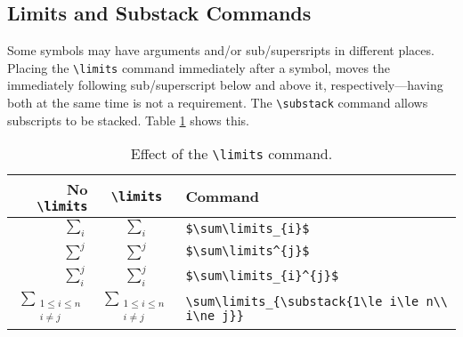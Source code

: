 \subsection{Limits and Substack Commands}
%
Some symbols may have arguments and/or sub/supersripts in different places. Placing the \verb|\limits| command immediately after a symbol, moves the immediately following sub/superscript below and above it, respectively---having both at the same time is not a requirement. The \verb|\substack| command allows subscripts to be stacked. Table \ref{t:limits} shows this.
\begin{table}[!htbp]
    \centering
    \caption{Effect of the \texttt{\textbackslash limits} command.}
    \label{t:limits}
    \begin{tabular}{rcl}
        \toprule
        No \verb|\limits| & \verb|\limits| & Command\\
        \midrule
        $\sum_{i}$ & $\sum\limits_{i}$ & \verb|$\sum\limits_{i}$| \\[0.5cm]
        $\sum^{j}$ & $\sum\limits^{j}$ & \verb|$\sum\limits^{j}$| \\[0.5cm]
        $\sum_{i}^{j}$ & $\sum\limits_{i}^{j}$ & \verb|$\sum\limits_{i}^{j}$| \\[0.5cm]
        $\sum_{\substack{1\le i\le n\\ i\ne j}}$ & $\sum\limits_{\substack{1\le i\le n\\ i\ne j}}$ & \verb|\sum\limits_{\substack{1\le i\le n\\ i\ne j}}|\\[0.1cm]
        \bottomrule
    \end{tabular}
\end{table}
%
